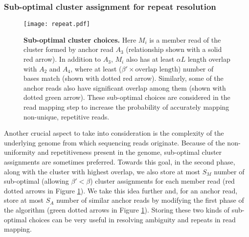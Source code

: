 \documentclass[a4paper]{article}
\begin{document}
\subsubsection{Sub-optimal cluster assignment for repeat resolution}
\begin{figure}
\centering
\texttt{[image: repeat.pdf]}
\caption{\label{fig:repeat}
{\bf Sub-optimal cluster choices.}
Here $M_i$ is a member read of the cluster formed by anchor read $A_3$
  (relationship shown with a solid red arrow).
  In addition to $A_3$, $M_i$ also has at least $\alpha L$ length overlap with
  $A_2$ and $A_4$, where at least ($\beta'\times\mbox{overlap length}$) number of bases match
  (shown with dotted red arrow).
  Similarly, some of the anchor reads also have significant overlap
  among them (shown with dotted green arrow). These sub-optimal choices
  are considered in the read mapping step to increase the probability of
  accurately mapping non-unique, repetitive reads.
}
\vspace{-4mm}
\end{figure}
Another crucial aspect to take into consideration is the complexity of
the underlying genome from which sequencing reads originate. Because
of the non-uniformity and repetitiveness present in the genome,
sub-optimal cluster assignments are sometimes preferred. Towards this goal,
in the second phase, along with the cluster with highest overlap, we also
store at most $S_M$ number of sub-optimal (allowing $\beta' < \beta$)
cluster assignments for each member read (red dotted arrows in Figure \ref{fig:repeat}).
We take this idea further and, for an anchor read, store at most
$S_A$ number of similar anchor reads by modifying the first phase of the
algorithm (green dotted arrows in Figure \ref{fig:repeat}).
Storing these two kinds of sub-optimal choices
can be very useful in resolving ambiguity and repeats in read mapping.
\end{document}
